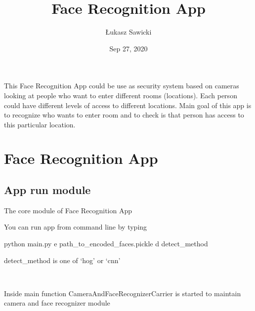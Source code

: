 \documentclass[letterpaper,10pt,english]{sphinxmanual}
\title{Face Recognition App}
\date{Sep 27, 2020}
\author{Łukasz Sawicki}
\begin{document}
\pagestyle{empty}
\sphinxmaketitle
\pagestyle{plain}
\sphinxtableofcontents
\pagestyle{normal}
\label{\detokenize{index::doc}}


This Face Recognition App could be use as security system based on cameras looking at people who want to enter different rooms (locations). Each person could have different levels of access to different locations. Main goal of this app is to recognize who wants to enter room and to check is that person has access to this particular location.


\chapter{Face Recognition App}
\label{\detokenize{modules:face-recognition-app}}\label{\detokenize{modules::doc}}

\section{App run module}
\label{\detokenize{main:module-main}}\label{\detokenize{main:app-run-module}}\label{\detokenize{main::doc}}
\begin{DUlineblock}{0em}
\item[] The core module of Face Recognition App
\item[] You can run app from command line by typing
\item[] python main.py \sphinxhyphen{}e path\_to\_encoded\_faces.pickle \sphinxhyphen{}d detect\_method
\item[] detect\_method is one of ‘hog’ or ‘cnn’
\end{DUlineblock}

\begin{fulllineitems}
\label{\detokenize{main:main.main}}~
\begin{DUlineblock}{0em}
\item[] Inside main function CameraAndFaceRecognizerCarrier is started to maintain camera and face recognizer module
\end{DUlineblock}

\end{fulllineitems}
\end{document}
